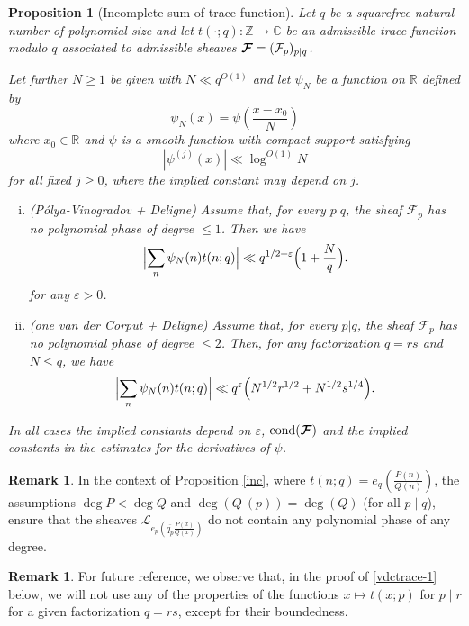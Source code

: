 \documentclass[12pt,a4paper,reqno]{amsart}
\numberwithin{equation}{section}
\DeclareMathOperator*\cond{cond}
\theoremstyle{plain}
\newtheorem{proposition}[theorem]{Proposition}
\theoremstyle{definition}
\newtheorem{remark}[theorem]{Remark}
\newcommand\R{\mathbb{R}}
\newcommand\Z{\mathbb{Z}}
\newcommand\C{\mathbb{C}}
\newcommand\eps{\varepsilon}
\newcommand{\uple}[1]{\text{\boldmath${#1}$}}
\newcommand\ov{\overline}
\newcommand\mcF{\mathcal{F}}
\newcommand\mcL{\mathcal{L}}
\begin{document}
\begin{proposition}[Incomplete sum of trace function]\label{inctrace}
  Let $q$ be a squarefree natural number of polynomial size and let
  $t(\cdot;q) \colon \Z\to \C$ be an admissible trace function modulo
  $q$ associated to admissible sheaves $\uple{\mcF}=(\mcF_p)_{p\mid
    q}$.
\par
Let further $N \geq 1$ be given with $N\ll q^{O(1)}$ and let $\psi_N$
be a function on $\R$ defined by
$$
\psi_N(x) = \psi\left(\frac{x-x_0}{N}\right)
$$
where $x_0\in \R$ and $\psi$ is a smooth function with compact support
satisfying
$$
|\psi^{(j)}(x)| \ll \log^{O(1)} N
$$
for all fixed $j \geq 0$, where the implied constant may depend on
$j$.
\begin{enumerate}[(i)]
\item (P\'olya-Vinogradov + Deligne) Assume that, for every $p|q$, the sheaf
  $\mcF_p$ has no polynomial phase of degree $\leq 1$. Then we have
\begin{equation}\label{vdctrace-0}
  \Bigl|\sum_n \psi_N(n) t(n;q)\Bigr| 
  \ll q^{1/2+\eps} \Bigl(1 + \frac{N}{q}\Bigr).
\end{equation}
for any $\eps>0$.
\item (one van der Corput + Deligne) Assume that, for every $p|q$, the sheaf
  $\mcF_p$ has no polynomial phase of degree $\leq 2$. Then, for any
  factorization $q = rs$ and $N \leq q$, we have
\begin{equation}\label{vdctrace-1}
  \Bigl|\sum_n \psi_N(n) t(n;q)\Bigr| \ll q^{\eps}\Bigl(
  N^{1/2}r^{1/2} + N^{1/2} s^{1/4}\Bigr).
\end{equation}
\end{enumerate}
In all cases the implied constants depend on $\eps$, $\cond(\uple{\mcF})$
and the implied constants in the estimates for the derivatives of
$\psi$.
\end{proposition}

\begin{remark} In the context of Proposition \ref{inc}, where
  $t(n;q)=e_q\left(\frac{P(n)}{Q(n)}\right)$, the assumptions $\deg
  P<\deg Q$ and $\deg(Q\ (p))=\deg(Q)$ (for all $p\mid q$), ensure that
  the sheaves $\mcL_{e_p\left(\ov{q_p}\frac{P(x)}{Q(x)}\right)}$ do
  not contain any polynomial phase of any degree.
\end{remark}

\begin{remark}\label{anyfunction} 
  For future reference, we observe that, in the proof of \eqref{vdctrace-1} below, we will not use
  any of the properties of the functions $x\mapsto t(x;p)$ for $p\mid
  r$ for a given factorization $q=rs$, except for their boundedness.
\end{remark}
\end{document}
